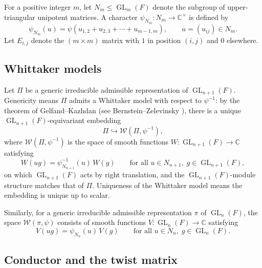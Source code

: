 \documentclass[12pt]{article}
\theoremstyle{definition}
\DeclareMathOperator{\GL}{GL}
\begin{document}
For a positive integer $m$, let $N_m \leq \GL_m(F)$ denote the subgroup of
upper-triangular unipotent matrices.  A character $\psi_{N_m}: N_m \to
\mathbb{C}^\times$ is defined by
\begin{equation}
  \label{eq:psi-Nm}
  \psi_{N_m}(u) = \psi(u_{1,2} + u_{2,3} + \cdots + u_{m-1,m}),
  \qquad u = (u_{ij}) \in N_m.
\end{equation}
Let $E_{i,j}$ denote the $(m\times m)$ matrix with $1$ in position $(i,j)$ and
$0$ elsewhere.

\subsection{Whittaker models}

Let $\Pi$ be a generic irreducible admissible representation of $\GL_{n+1}(F)$.
Genericity means $\Pi$ admits a Whittaker model with respect to $\psi^{-1}$: by the
theorem of Gelfand--Kazhdan (see Bernstein--Zelevinsky \cite{BZ}), there is a
unique $\GL_{n+1}(F)$-equivariant embedding
\[
  \Pi \hookrightarrow \mathcal{W}(\Pi, \psi^{-1}),
\]
where $\mathcal{W}(\Pi,\psi^{-1})$ is the space of smooth functions $W:
\GL_{n+1}(F) \to \mathbb{C}$ satisfying
\begin{equation}
  \label{eq:Whittaker-transform}
  W(ug) = \psi^{-1}_{N_{n+1}}(u)\,W(g)
  \qquad \text{for all } u \in N_{n+1},\; g \in \GL_{n+1}(F),
\end{equation}
on which $\GL_{n+1}(F)$ acts by right translation, and the
$\GL_{n+1}(F)$-module structure matches that of $\Pi$.  Uniqueness of the
Whittaker model means the embedding is unique up to scalar.

Similarly, for a generic irreducible admissible representation $\pi$ of
$\GL_n(F)$, the space $\mathcal{W}(\pi,\psi)$ consists of smooth functions
$V: \GL_n(F) \to \mathbb{C}$ satisfying
\[
  V(ug) = \psi_{N_n}(u)\,V(g)
  \qquad \text{for all } u \in N_n,\; g \in \GL_n(F).
\]

\subsection{Conductor and the twist matrix}
\end{document}
